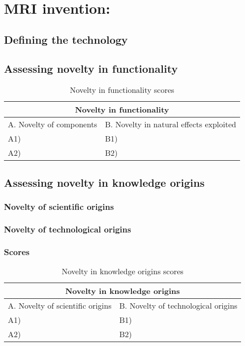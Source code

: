 \section{MRI invention: }
\subsection{Defining the technology}

\subsection{Assessing novelty in functionality}
\begin{table}[h]
\centering
\begin{tabular}{l l}
\hline
\multicolumn{2}{|c|}{Novelty in functionality} \\
\hline
A. Novelty of components & B. Novelty in natural effects exploited\\
A1) & B1)\\ 
A2) & B2)\\ 
\hline
\end{tabular}
\caption{Novelty in functionality scores}
\label{tbl:funcscores3}
\end{table}

\subsection{Assessing novelty in knowledge origins}
\subsubsection{Novelty of scientific origins}

\subsubsection{Novelty of technological origins}

\subsubsection{Scores}
\begin{table}[h]
\centering
\begin{tabular}{l l}
\hline
\multicolumn{2}{|c|}{Novelty in knowledge origins} \\
\hline
A. Novelty of scientific origins & B. Novelty of technological origins\\
A1) & B1)\\ 
A2) & B2)\\ 
\hline
\end{tabular}
\caption{Novelty in knowledge origins scores}
\label{tbl:origscores3}
\end{table}

